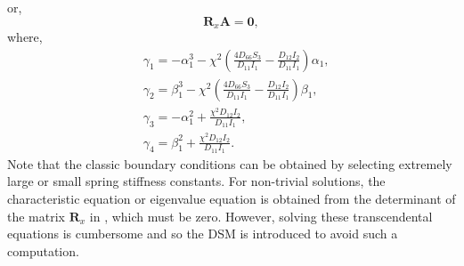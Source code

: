 \documentclass[preprint,12pt]{elsarticle}
\begin{document}
%
or,
%
\begin{equation}\label{eq:ABx1}
		\mathbf{R}_x \mathbf{A} = \mathbf{0},
\end{equation}
%
where,
%
\begin{equation}\label{eq:gamma}
	\begin{split}
		&\gamma_1 = -\alpha_1^3 - \chi^2 \left( \frac{4D_{66}S_3}{D_{11}I_1} - \frac{D_{12}I_2}{D_{11}I_1} \right) \alpha_1, \\
		&\gamma_2 = \beta_1^3 - \chi^2 \left( \frac{4D_{66}S_3}{D_{11}I_1} - \frac{D_{12}I_2}{D_{11}I_1} \right) \beta_1, \\
		&\gamma_3 = -\alpha_1^2 + \frac{\chi^2 D_{12} I_2}{D_{11} I_1}, \\
		&\gamma_4 = \beta_1^2 + \frac{\chi^2 D_{12} I_2}{D_{11} I_1}.
	\end{split}
\end{equation}
%
Note that the classic boundary conditions can be obtained by selecting extremely large or small spring stiffness constants.
For non-trivial solutions, the characteristic equation or eigenvalue equation is obtained from the determinant of the matrix $\mathbf{R}_x$ in , which must be zero.
However, solving these transcendental equations is cumbersome and so the DSM is introduced to avoid such a computation.
\end{document}
